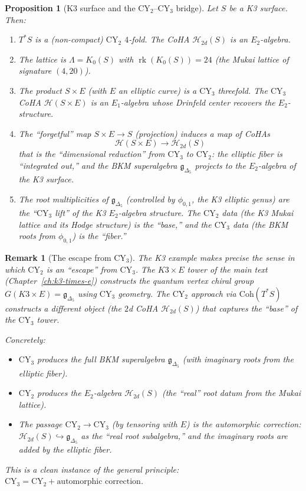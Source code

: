 \documentclass[11pt]{article}
\theoremstyle{garamondthm}
\newtheorem{proposition}[theorem]{Proposition}
\theoremstyle{garamonddef}
\theoremstyle{garamondrem}
\newtheorem{remark}[theorem]{Remark}
\newcommand{\Coh}{\mathrm{Coh}}
\newcommand{\CY}{\mathrm{CY}}
\newcommand{\Eone}{E_1}
\newcommand{\Etwo}{E_2}
\newcommand{\cH}{\mathcal{H}}
\newcommand{\frakg}{\mathfrak{g}}
\DeclareMathOperator{\rk}{rk}
\begin{document}
\begin{proposition}[K3 surface and the CY$_2$--CY$_3$ bridge]
\label{prop:k3-bridge}
Let $S$ be a K3 surface. Then:
\begin{enumerate}[label=(\roman*)]
 \item $T^*S$ is a (non-compact) $\CY_2$ $4$-fold. The CoHA $\cH_{2d}(S)$ is an $\Etwo$-algebra.
 \item The lattice is $\Lambda = K_0(S)$ with $\rk(K_0(S)) = 24$ (the Mukai lattice of signature $(4, 20)$).
 \item The product $S \times E$ (with $E$ an elliptic curve) is a $\CY_3$ threefold. The $\CY_3$ CoHA $\cH(S \times E)$ is an $\Eone$-algebra whose Drinfeld center recovers the $\Etwo$-structure.
 \item The ``forgetful'' map $S \times E \to S$ (projection) induces a map of CoHAs
 \[
 \cH(S \times E) \longrightarrow \cH_{2d}(S)
 \]
 that is the ``dimensional reduction'' from $\CY_3$ to $\CY_2$: the elliptic fiber is ``integrated out,'' and the BKM superalgebra $\frakg_{\Delta_5}$ projects to the $\Etwo$-algebra of the K3 surface.
 \item The root multiplicities of $\frakg_{\Delta_5}$ (controlled by $\phi_{0,1}$, the K3 elliptic genus) are the ``$\CY_3$ lift'' of the K3 $\Etwo$-algebra structure. The $\CY_2$ data (the K3 Mukai lattice and its Hodge structure) is the ``base,'' and the $\CY_3$ data (the BKM roots from $\phi_{0,1}$) is the ``fiber.''
\end{enumerate}
\end{proposition}

\begin{remark}[The escape from $\CY_3$]
\label{rem:escape-cy3}
The K3 example makes precise the sense in which $\CY_2$ is an ``escape'' from $\CY_3$. The $K3 \times E$ tower of the main text (Chapter~\ref{ch:k3-times-e}) constructs the quantum vertex chiral group $G(K3 \times E) = \frakg_{\Delta_5}$ using $\CY_3$ geometry. The $\CY_2$ approach via $\Coh(T^*S)$ constructs a \emph{different} object (the $2$d CoHA $\cH_{2d}(S)$) that captures the ``base'' of the $\CY_3$ tower.

Concretely:
\begin{itemize}
 \item $\CY_3$ produces the full BKM superalgebra $\frakg_{\Delta_5}$ (with imaginary roots from the elliptic fiber).
 \item $\CY_2$ produces the $\Etwo$-algebra $\cH_{2d}(S)$ (the ``real'' root datum from the Mukai lattice).
 \item The passage $\CY_2 \to \CY_3$ (by tensoring with $E$) is the automorphic correction: $\cH_{2d}(S) \hookrightarrow \frakg_{\Delta_5}$ as the ``real root subalgebra,'' and the imaginary roots are added by the elliptic fiber.
\end{itemize}

This is a clean instance of the general principle: $\CY_3 = \CY_2 + \text{automorphic correction}$.
\end{remark}
\end{document}
